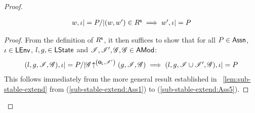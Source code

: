 \begin{lemma}[Stability]
\begin{proof}
{\begin{lemma}[]
% 
\[
\begin{array}{@{} l @{}}
	w, \lenv |= P /| (w, w') \in \shiftR 
	\implies  w', \lenv |= P
\end{array}
\]
%
\begin{proof}
From the definition of $R^{\textsf{s}}$, it then suffices to show that for all $P \in \textsf{Assn}$, $\iota \in \textsf{LEnv}$, $l, g, \in \textsf{LState}$ and $\mathscr{I}, \mathscr{I}', \mathscr{G}, \mathscr{G} \in \textsf{AMod}$: 
% 
\[
\begin{array}{@{} l @{}}
	(l, g, \lmod, \gmod), \lenv |= P /| 
	\expandsAM{\gmod}{\unitL}{\lmod'}{g}{\lmod}{\gmod}
	 \implies  (l, g, \lmod \cup \lmod', \gmod), \lenv |= P
\end{array}
\]
%
This follows immediately from the more general result established in \lem~\ref{lem:sub-stable-extend} from (\ref{sub-stable-extend:Ass1}) to (\ref{sub-stable-extend:Ass5}).
\end{proof}
%
\end{lemma}
}
\end{proof}
%	 
\end{lemma}
%
